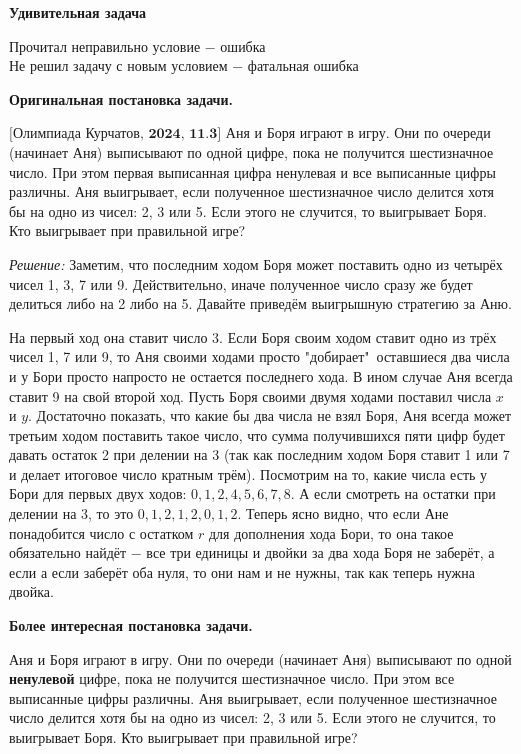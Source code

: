\hspace{3mm}

\centerline{\bf \Huge  Удивительная задача}

\begin{flushright}
    \scriptsize{Прочитал неправильно условие $-$ ошибка\\ Не решил задачу с новым условием $-$ фатальная ошибка}
\end{flushright}

\textbf{\large Оригинальная постановка задачи.}

$\bigl[\textbf{Олимпиада Курчатов, 2024, 11.3}\bigr]$ Аня и Боря играют в игру. Они по очереди (начинает Аня) выписывают по одной цифре, пока не получится шестизначное число. При этом первая выписанная цифра ненулевая и все выписанные цифры различны. Аня выигрывает, если полученное шестизначное число делится хотя бы на одно из чисел: 2, 3 или 5. Если этого не случится, то выигрывает Боря. Кто выигрывает при правильной игре?

\textit{Решение:} Заметим, что последним ходом Боря может поставить одно из четырёх чисел 1, 3, 7 или 9. Действительно, иначе полученное число сразу же будет делиться либо на 2 либо на 5. Давайте приведём выигрышную стратегию за Аню. 

На первый ход она ставит число 3. Если Боря своим ходом ставит одно из трёх чисел 1, 7 или 9, то Аня своими ходами просто "добирает"\  оставшиеся два числа и у Бори просто напросто не остается последнего хода. В ином случае Аня всегда ставит 9 на свой второй ход. Пусть Боря своими двумя ходами поставил числа $x$ и $y$. Достаточно показать, что какие бы два числа не взял Боря, Аня всегда может третьим ходом поставить такое число, что сумма получившихся пяти цифр будет давать остаток 2 при делении на 3 (так как последним ходом Боря ставит 1 или 7 и делает итоговое число кратным трём). Посмотрим на то, какие числа есть у Бори для первых двух ходов: $0, 1, 2, 4, 5, 6, 7, 8$. А если смотреть на остатки при делении на 3, то это $0, 1, 2, 1, 2, 0, 1, 2$. Теперь ясно видно, что если Ане понадобится число с остатком $r$ для дополнения хода Бори, то она такое обязательно найдёт $-$ все три единицы и двойки за два хода Боря не заберёт, а если а если заберёт оба нуля, то они нам и не нужны, так как теперь нужна двойка. 

\textbf{Более интересная постановка задачи.}

 Аня и Боря играют в игру. Они по очереди (начинает Аня) выписывают по одной \textbf{ненулевой} цифре, пока не получится шестизначное число. При этом все выписанные цифры различны. Аня выигрывает, если полученное шестизначное число делится хотя бы на одно из чисел: 2, 3 или 5. Если этого не случится, то выигрывает Боря. Кто выигрывает при правильной игре?

